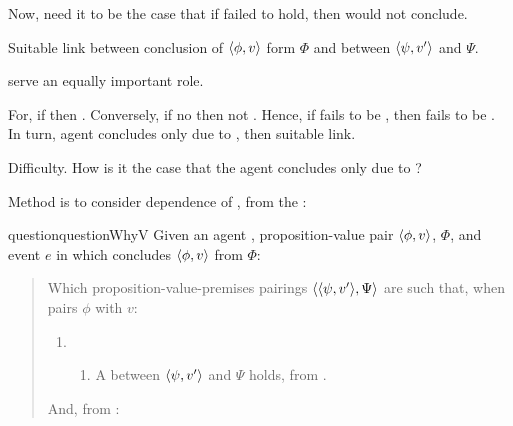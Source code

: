 \begin{note}
  Now, need it to be the case that if \ros{} failed to hold, then would not conclude.

  Suitable link between conclusion of \(\langle \phi, v \rangle\) form \(\Phi\) and \ros{} between \(\langle \psi, v' \rangle\) and \(\Psi\).

   serve an equally important role.

  For, if \fc{} then \ros{}.
  Conversely, if no \ros{} then not \fc{}.
  Hence, if fails to be \ros{}, then fails to be \fc{}.
  In turn, agent concludes only due to \fc{}, then suitable link.
\end{note}

\begin{note}
  Difficulty.
  How is it the case that the agent concludes only due to \fc{}?

  Method is to consider dependence of \qWhyVnP{}, from the \agpe{}:

  \begin{restatable}[\qWhyV{}]{question}{questionWhyV}
    \label{q:why:v}
    Given an agent \vAgent{}, proposition-value pair \(\langle \phi, v \rangle\), \poP{} \(\Phi\), and event \(e\) in which \vAgent{} concludes \(\langle \phi, v \rangle\) from \(\Phi\):

    \begin{quote}
      Which proposition-value-premises pairings \(\langle \langle \psi, v' \rangle, \Psi \rangle\) are such that, when \vAgent{} pairs \(\phi\) with \(v\):

      \begin{enumerate}[label=]
      \item
        \begin{enumerate}[label=\alph*., ref=(\alph*), series=qWhyVDef]
        \item
          A  between \(\langle \psi, v' \rangle\) and \(\Psi\) holds, from .
        \end{enumerate}
      \end{enumerate}

      And, from :


\end{quote}
\end{restatable}
\end{note}
